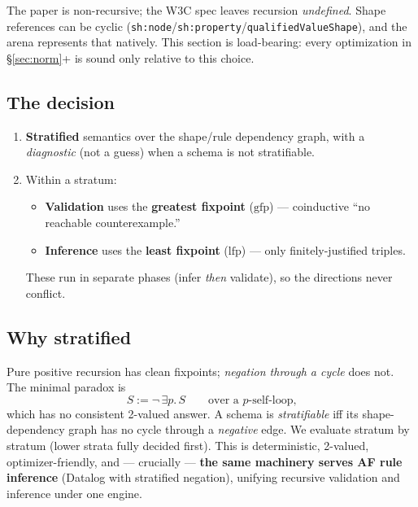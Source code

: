\documentclass[11pt]{article}
\newcommand{\lfp}{\mathrm{lfp}}
\newcommand{\gfp}{\mathrm{gfp}}
\newcommand{\code}[1]{\texttt{#1}}
\theoremstyle{definition}
\begin{document}
The paper is non-recursive; the W3C spec leaves recursion \emph{undefined}. Shape
references can be cyclic (\code{sh:node}/\code{sh:property}/\code{qualifiedValueShape}),
and the arena represents that natively. This section is load-bearing: every
optimization in \S\ref{sec:norm}+ is sound only relative to this choice.

\subsection{The decision}
\begin{enumerate}[leftmargin=1.6em]
  \item \textbf{Stratified} semantics over the shape/rule dependency graph, with
  a \emph{diagnostic} (not a guess) when a schema is not stratifiable.
  \item Within a stratum:
  \begin{itemize}
    \item \textbf{Validation} uses the \textbf{greatest fixpoint} ($\gfp$) ---
    coinductive ``no reachable counterexample.''
    \item \textbf{Inference} uses the \textbf{least fixpoint} ($\lfp$) --- only
    finitely-justified triples.
  \end{itemize}
  These run in separate phases (infer \emph{then} validate), so the directions
  never conflict.
\end{enumerate}

\subsection{Why stratified}
Pure positive recursion has clean fixpoints; \emph{negation through a cycle} does
not. The minimal paradox is
\[
S := \neg\,\exists p.\,S \qquad\text{over a $p$-self-loop,}
\]
which has no consistent 2-valued answer. A schema is \emph{stratifiable} iff its
shape-dependency graph has no cycle through a \emph{negative} edge. We evaluate
stratum by stratum (lower strata fully decided first). This is deterministic,
2-valued, optimizer-friendly, and --- crucially --- \textbf{the same machinery
serves AF rule inference} (Datalog with stratified negation), unifying recursive
validation and inference under one engine.
\end{document}
